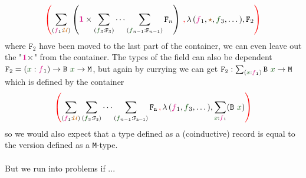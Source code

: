 \documentclass[twoside,11pt,openright]{report}
\theoremstyle{plain} %
\theoremstyle{definition}
\theoremstyle{remark}
\newcommand*{\term}[1]{\textcolor{green!30!black}{#1}} %
\newcommand*{\type}[1]{\textcolor{magenta!90!black}{#1}}
\newcommand*{\containerpair}[2]{\ensuremath{\colorlet{savedleftcolor}{.}\color{red}\left(\color{savedleftcolor}#1\,\textcolor{red}{\mathbf{,}}\,#2\color{red}\right)\color{savedleftcolor}}}
\newcommand*{\universe}[1]{\textcolor{orange!80!black}{#1}}
\newcommand*{\unit}{\type{\textbf{1}}}
\newcommand*{\constant}[1]{\textcolor{orange!60!black}{\ensuremath{\mathtt{#1}}}}
\newcommand*{\typeformer}[1]{\ensuremath{\mathtt{#1}}}
\newcommand*{\unitelem}{\constant{\star}} %
\begin{document}
\begin{equation}
  \containerpair{\sum_{(\type{f}_1 : \universe{\mathcal{U}})} \left(\unit \times \sum_{(\term{f}_3 : \typeformer{F}_3)} \cdots \sum_{(\term{f}_{n-1} : \typeformer{F}_{n-1})}\typeformer{F}_n\right)}{\lambda\,(\type{f}_1,\unitelem,\term{f}_3,\dots),\typeformer{F}_2}
\end{equation}
where \(\typeformer{F}_2\) have been moved to the last part of the container, we can even leave out the "\(\unit \times\)" from the container. The types of the field can also be dependent \(\typeformer{F_2} = (\term{x} : \type{f}_1) \rightarrow \typeformer{B}~\term{x} \rightarrow \mathtt{M}\), but again by currying we can get \(\typeformer{F_2} : \sum_{(\term{x} : \type{f}_1)} \typeformer{B}~\term{x} \rightarrow \mathtt{M}\) which is defined by the container
\begin{equation}
  \containerpair{\sum_{(\type{f}_1 : \universe{\mathcal{U}})} \sum_{(\term{f}_3 : \typeformer{F_3})} \cdots \sum_{(\term{f}_{n-1} : \typeformer{F_{n-1}})}\typeformer{F_n}}{\lambda\,(\type{f}_1,\term{f}_3,\dots),\sum_{\term{x} : \type{f}_1} (\typeformer{B}~\term{x})}
\end{equation}
so we would also expect that a type defined as a (coinductive) record is equal to the version defined as a \texttt{M}-type. 
\\ \\
But we run into problems if ...  
\end{document}
